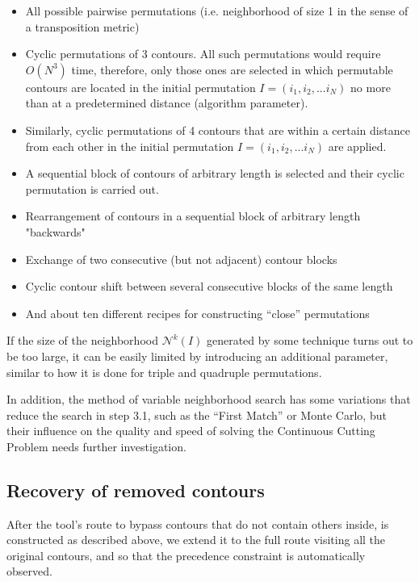 \documentclass[]{interact}
\theoremstyle{plain}%
\theoremstyle{definition}
\theoremstyle{remark}
\begin{document}
\begin{itemize}
  \item All possible pairwise permutations
  (i.e. neighborhood of size 1 in the sense of a transposition metric)
  \item
  Cyclic permutations of 3 contours.
  All such permutations would require
  $O (N ^ 3)$ time,
  therefore, only those ones are selected
  in which permutable contours are located
  in the initial permutation
  $I = (i_1, i_2, ... i_N)$
  no more than at a predetermined distance
  (algorithm parameter).
  \item
  Similarly,
  cyclic permutations of 4 contours
  that are within a certain distance from each other
  in the initial permutation
  $I = (i_1, i_2, ... i_N)$
  are applied.
  \item
  A sequential block of contours
  of arbitrary length is selected
  and their cyclic permutation is carried out.
  \item
  Rearrangement of contours in a sequential block
  of arbitrary length "backwards"
  \item
  Exchange of two consecutive
  (but not adjacent)
  contour blocks
  \item
  Cyclic contour shift between
  several consecutive blocks of the same length
  \item
  And about ten different recipes for constructing ``close'' permutations
\end{itemize}

If the size of the neighborhood
$\mathcal N^k(I)$
generated by some technique
turns out to be too large,
it can be easily limited by
introducing an additional parameter,
similar to how it is done for
triple and quadruple permutations.

In addition,
the method of variable neighborhood search
has some variations that reduce
the search in step 3.1,
such as the ``First Match''
or Monte Carlo,
but their influence on the quality and speed of
solving the Continuous Cutting Problem
needs further investigation.

\subsection{Recovery of removed contours}

After the tool’s route
to bypass contours
that do not contain others inside,
is constructed as described above,
we extend it to the full route
visiting all the original contours,
and so that the precedence constraint is
automatically
observed.
\end{document}
